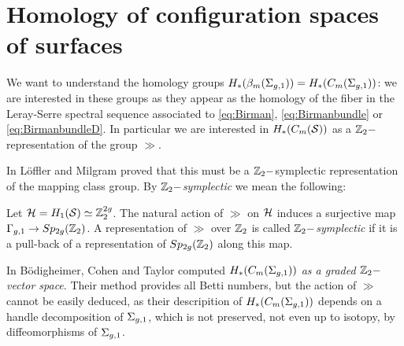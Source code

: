 \section{Homology of configuration spaces of surfaces}
\label{sec:HBraidSurf}
We want to understand the homology groups $H_*(\bms)=H_*(C_m(\sg))$: we
are interested in these groups as they appear as the homology of the fiber
in the Leray-Serre spectral sequence associated to
\ref{eq:Birman}, \ref{eq:Birmanbundle} or \ref{eq:BirmanbundleD}.
In particular we are interested in $H_*(C_m(\S))$
as a $\Z_2-$representation of the group $\gg$.

In \cite{LM} L\"offler and Milgram proved that this must be a $\Z_2-$symplectic
representation of the mapping class group. By \emph{$\Z_2-$symplectic} we mean the following:
\begin{defn}
 \label{defn:symplrep}
 Let $\H=H_1(\S)\simeq\Z_2^{2g}$.
 The natural action of $\gg$ on $\H$ induces a surjective map
 $\gg\to Sp_{2g}(\Z_2)$. A representation of $\gg$ over $\Z_2$ is called \emph{$\Z_2-$symplectic}
 if it is a pull-back of a representation of $Sp_{2g}(\Z_2)$ along this map.
\end{defn}

In \cite{BCT} B\"odigheimer, Cohen and Taylor computed $H_*(C_m(\sg))$ \emph{as a graded $\Z_2-$vector space}.
Their method provides all Betti numbers, but the action of $\gg$ cannot be easily deduced, as
their descripition of $H_*(C_m(\sg))$ depends on a handle decomposition of $\sg$, which is not preserved,
not even up to isotopy, by diffeomorphisms of $\sg$.

